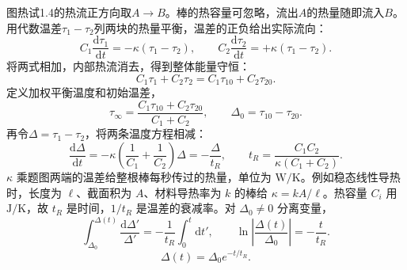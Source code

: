 \documentclass[UTF8,fontset=fandol,a4paper,11pt]{ctexart}
\begin{document}
图热试1.4的热流正方向取$A\to B$。棒的热容量可忽略，流出$A$的热量随即流入$B$。用代数温差$\tau_1-\tau_2$列两块的热量平衡，温差的正负给出实际流向：
\[
C_1\frac{\mathrm d\tau_1}{\mathrm dt}=-\kappa(\tau_1-\tau_2),
\qquad
C_2\frac{\mathrm d\tau_2}{\mathrm dt}=+\kappa(\tau_1-\tau_2).
\]
将两式相加，内部热流消去，得到整体能量守恒：
\[
C_1\tau_1+C_2\tau_2
=C_1\tau_{10}+C_2\tau_{20}.
\]
定义加权平衡温度和初始温差，
\[
\tau_\infty=\frac{C_1\tau_{10}+C_2\tau_{20}}{C_1+C_2},
\qquad
\Delta_0=\tau_{10}-\tau_{20}.
\]
再令$\Delta=\tau_1-\tau_2$，将两条温度方程相减：
\[
\frac{\mathrm d\Delta}{\mathrm dt}
=-\kappa\left(\frac1{C_1}+\frac1{C_2}\right)\Delta
=-\frac{\Delta}{t_R},
\qquad
t_R=\frac{C_1C_2}{\kappa(C_1+C_2)}.
\]
$\kappa$ 乘题图两端的温差给整根棒每秒传过的热量，单位为 $\mathrm{W/K}$。例如稳态线性导热时，长度为 $\ell$、截面积为 $A$、材料导热率为 $k$ 的棒给 $\kappa=kA/\ell$。热容量 $C_i$ 用 $\mathrm{J/K}$，故 $t_R$ 是时间，$1/t_R$ 是温差的衰减率。对 $\Delta_0\ne0$ 分离变量，
\[
\int_{\Delta_0}^{\Delta(t)}\frac{\mathrm d\Delta'}{\Delta'}
=-\frac1{t_R}\int_0^t\mathrm dt',
\qquad
\ln\left|\frac{\Delta(t)}{\Delta_0}\right|=-\frac t{t_R}.
\]
\[
\boxed{\Delta(t)=\Delta_0e^{-t/t_R}}.
\]
\end{document}
